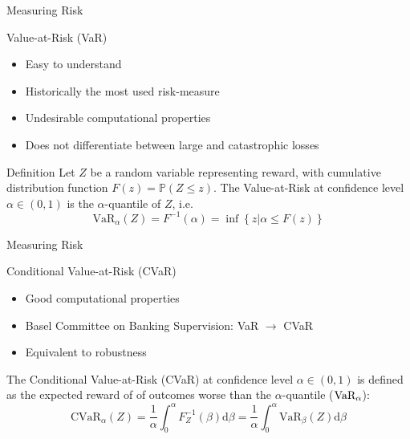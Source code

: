 \documentclass{beamer}
\begin{document}

\begin{frame}{Measuring Risk}
\begin{block}{Value-at-Risk (VaR)}
\begin{itemize}
\item Easy to understand
\item Historically the most used risk-measure
\item Undesirable computational properties
\item Does not differentiate between large and catastrophic losses
\end{itemize}

\end{block}

\begin{block}{Definition}
Let $Z$ be a random variable representing reward, with cumulative distribution function $F(z) = \mathbb{P}(Z \le z)$.
The Value-at-Risk  at confidence level $\alpha \in (0,1)$ is the $\alpha$-quantile of $Z$, i.e. 
\begin{equation*}
\text{VaR}_\alpha(Z)=F^{-1}(\alpha)=\inf\left\lbrace z | \alpha \le F(z) \right\rbrace
\end{equation*}
\end{block}

\end{frame}


\begin{frame}{Measuring Risk}
\begin{block}{Conditional Value-at-Risk (CVaR)}
\begin{itemize}
\item Good computational properties
\item Basel Committee on Banking Supervision: VaR $\to$ CVaR
\item Equivalent to robustness
\end{itemize}
\end{block}

\begin{definition}
The Conditional Value-at-Risk (CVaR) at confidence level $\alpha \in (0,1)$ is defined as the expected reward of of outcomes worse than the $\alpha$-quantile ($\text{VaR}_\alpha$):
\begin{equation*}
\text{CVaR}_\alpha(Z) = \dfrac{1}{\alpha}\int_0^\alpha F^{-1}_Z(\beta) \text{d}\beta = \dfrac{1}{\alpha}\int_0^\alpha \text{VaR}_\beta(Z) \text{d}\beta
\end{equation*}
\end{definition}
\end{frame}
\end{document}
